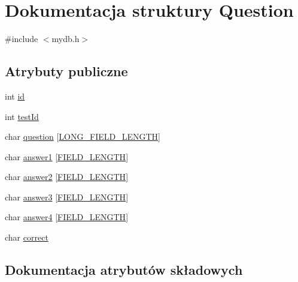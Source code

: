 \hypertarget{structQuestion}{}\section{Dokumentacja struktury Question}
\label{structQuestion}


{\ttfamily \#include $<$mydb.\+h$>$}

\subsection*{Atrybuty publiczne}
\begin{DoxyCompactItemize}
\item 
int \mbox{\hyperlink{structQuestion_ab7a4a82dd8625e50c247670c41bdfe23}{id}}
\item 
int \mbox{\hyperlink{structQuestion_ad0cf3ed6dd2784d1a18116aaf19700df}{test\+Id}}
\item 
char \mbox{\hyperlink{structQuestion_af1123680bf154eb00454fe9872f0e9b5}{question}} \mbox{[}\mbox{\hyperlink{mydb_8h_acb932076e71b8c1d0658cc6c33043cb3}{L\+O\+N\+G\+\_\+\+F\+I\+E\+L\+D\+\_\+\+L\+E\+N\+G\+TH}}\mbox{]}
\item 
char \mbox{\hyperlink{structQuestion_ae306f51695f64973343e9af1f80e6957}{answer1}} \mbox{[}\mbox{\hyperlink{mydb_8h_a4e8ecaf2d59499a8c159ccdf7be1baec}{F\+I\+E\+L\+D\+\_\+\+L\+E\+N\+G\+TH}}\mbox{]}
\item 
char \mbox{\hyperlink{structQuestion_a1a6f4a873b32609a0475d3a2902d1215}{answer2}} \mbox{[}\mbox{\hyperlink{mydb_8h_a4e8ecaf2d59499a8c159ccdf7be1baec}{F\+I\+E\+L\+D\+\_\+\+L\+E\+N\+G\+TH}}\mbox{]}
\item 
char \mbox{\hyperlink{structQuestion_a3ab3e9b12d5358ab16a493747647161d}{answer3}} \mbox{[}\mbox{\hyperlink{mydb_8h_a4e8ecaf2d59499a8c159ccdf7be1baec}{F\+I\+E\+L\+D\+\_\+\+L\+E\+N\+G\+TH}}\mbox{]}
\item 
char \mbox{\hyperlink{structQuestion_a7966046ed86d5959a74a8aab9554d168}{answer4}} \mbox{[}\mbox{\hyperlink{mydb_8h_a4e8ecaf2d59499a8c159ccdf7be1baec}{F\+I\+E\+L\+D\+\_\+\+L\+E\+N\+G\+TH}}\mbox{]}
\item 
char \mbox{\hyperlink{structQuestion_a5ad88ad3b7a9b7763dd81d92b754ac1d}{correct}}
\end{DoxyCompactItemize}


\subsection{Dokumentacja atrybutów składowych}
\mbox{\label{structQuestion_ae306f51695f64973343e9af1f80e6957}} 
